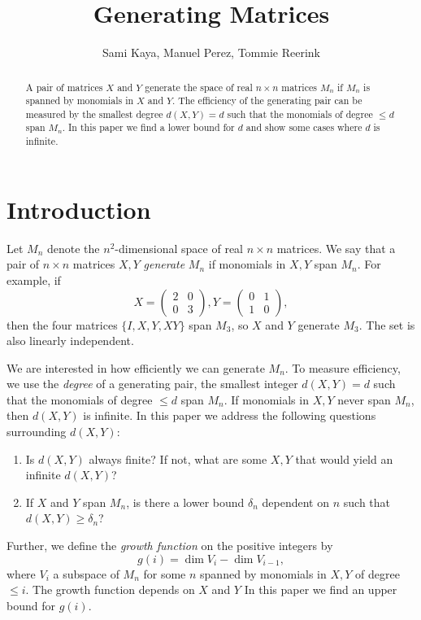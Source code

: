 \documentclass[11pt]{amsart}
\title[title]{Generating Matrices}
\author{Sami Kaya, Manuel Perez, Tommie Reerink}
\numberwithin{equation}{section}
\numberwithin{figure}{section}
\numberwithin{theorem}{section}
\begin{document}
\maketitle
\begin{abstract}
A pair of matrices $X$ and $Y$ generate the space of real $n\times n$ matrices $M_n$ if $M_n$ is spanned by  monomials in $X$ and $Y$. The efficiency of the generating pair can be measured by the smallest degree $d(X,Y)=d$ such that the monomials of degree $\leq d$ span $M_n$. In this paper we find a lower bound for $d$ and show some cases where $d$ is infinite. 
\end{abstract}
\section{Introduction}
Let $M_n$ denote the $n^2$-dimensional space of real $n\times n$ matrices. We say that a pair of $n\times n$ matrices $X,Y$ \textit{generate} $M_n$ if monomials in $X,Y$ span $M_n$. For example, if $$X=\begin{pmatrix}2&0\\0&3\end{pmatrix}, Y=\begin{pmatrix}0&1\\1&0\end{pmatrix},$$ then the four matrices $\{I,X,Y,XY\}$ span $M_3$, so $X$ and $Y$ generate $M_3$. The set is also linearly independent. 

We are interested in how efficiently we can generate $M_n$. To measure efficiency, we use the \textit{degree} of a generating pair, the smallest integer $d(X,Y)=d$ such that the monomials of degree $\leq d$ span $M_n$. If monomials in $X,Y$ never span $M_n$, then $d(X,Y)$ is infinite. In this paper we address the following questions surrounding $d(X,Y)$: 
\begin{enumerate}
    \item Is $d(X,Y)$ always finite? If not, what are some $X,Y$ that would yield an infinite $d(X,Y)$?
    \item If $X$ and $Y$ span $M_n$, is there a lower bound $\delta_n$ dependent on $n$ such that $d(X,Y)\geq\delta_n$?
\end{enumerate}
Further, we define the \textit{growth function} on the positive integers by $$g(i)=\dim V_i-\dim V_{i-1},$$ where $V_i$ a subspace of $M_n$ for some $n$ spanned by monomials in $X,Y$ of degree $\leq i$. The growth function depends on $X$ and $Y$ In this paper we find an upper bound for $g(i)$. 
\end{document}
